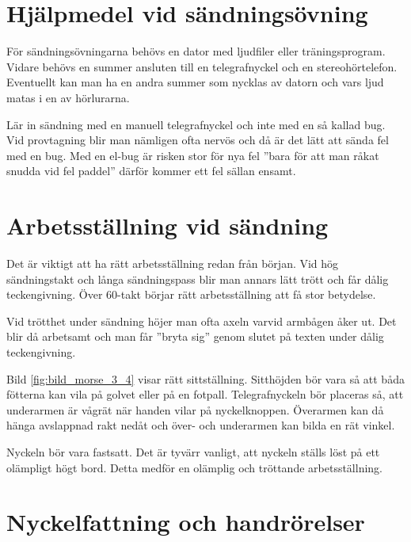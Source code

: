\section[Övningshjälpmedel]{Hjälpmedel vid sändningsövning}

För sändningsövningarna behövs en dator med ljudfiler eller träningsprogram.
Vidare behövs en summer ansluten till en telegrafnyckel och en stereohörtelefon.
Eventuellt kan man ha en andra summer som nycklas av datorn och vars ljud matas
i en av hörlurarna.

Lär in sändning med en manuell telegrafnyckel och inte med en så kallad bug.
Vid provtagning blir man nämligen ofta nervös och då är det lätt att sända fel
med en bug.
Med en el-bug är risken stor för nya fel ''bara för att man råkat snudda vid fel
paddel'' därför kommer ett fel sällan ensamt.


\section[Ställning]{Arbetsställning vid sändning}

Det är viktigt att ha rätt arbetsställning redan från början.
Vid hög sändningstakt och långa sändningspass blir man annars lätt trött och
får dålig teckengivning.
Över 60-takt börjar rätt arbetsställning att få stor betydelse.

Vid trötthet under sändning höjer man ofta axeln varvid armbågen åker ut.
Det blir då arbetsamt och man får ''bryta sig'' genom slutet på texten under
dålig teckengivning.

Bild \ref{fig:bild_morse_3_4} visar rätt sittställning.
Sitthöjden bör vara så att båda fötterna kan vila på golvet eller på en fotpall.
Telegrafnyckeln bör placeras så, att underarmen är vågrät när handen vilar på
nyckelknoppen.
Överarmen kan då hänga avslappnad rakt nedåt och över- och underarmen kan bilda
en rät vinkel.

Nyckeln bör vara fastsatt. Det är tyvärr vanligt, att nyckeln ställs löst på ett
olämpligt högt bord. Detta medför en olämplig och tröttande arbetsställning.

\section[Fattning]{Nyckelfattning och handrörelser}

